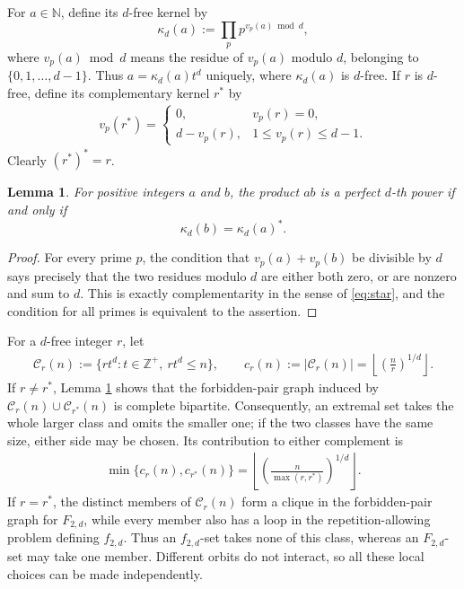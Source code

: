 \documentclass[10pt,a4paper]{amsart}
\numberwithin{equation}{section}
\newcommand{\cC}{\mathcal C}
\newcommand{\1}{\mathbf 1}
\newtheorem{lemma}[theorem]{Lemma}
\begin{document}
For $a\in\mathbb{N}$, define its $d$-free kernel by
\[
 \kappa_d(a):=\prod_p p^{v_p(a)\bmod d},
\]
where $v_p(a)\bmod d$ means the residue of $v_p(a)$ modulo $d$, belonging to $\{0,1,\ldots,d-1\}$.
Thus $a=\kappa_d(a)t^d$ uniquely, where $\kappa_d(a)$ is $d$-free.
If $r$ is $d$-free, define its complementary kernel $r^*$ by
\begin{align}
 v_p(r^*)=
 \begin{cases}
 0,&v_p(r)=0,\\
 d-v_p(r),&1\leq v_p(r)\leq d-1.
 \end{cases}
\label{eq:star}
\end{align}
Clearly $(r^*)^*=r$.

\begin{lemma}\label{lem:kernelcriterion}
For positive integers $a$ and $b$, the product $ab$ is a perfect
$d$-th power if and only if
\[
 \kappa_d(b)=\kappa_d(a)^*.
\]
\end{lemma}

\begin{proof}
For every prime $p$, the condition that $v_p(a)+v_p(b)$ be divisible
by $d$ says precisely that the two residues modulo $d$ are either both
zero, or are nonzero and sum to $d$.  This is exactly complementarity
in the sense of \eqref{eq:star}, and the condition for all primes is
equivalent to the assertion.
\end{proof}

For a $d$-free integer $r$, let
\begin{align}
 \cC_r(n):=\{rt^d:t\in\mathbb{Z}^{+},\ rt^d\leq n\},
 \qquad
 c_r(n):=|\cC_r(n)|
 =\left\lfloor\left(\frac nr\right)^{1/d}\right\rfloor.\label{eq:classes}
\end{align}
If $r\neq r^*$, Lemma \ref{lem:kernelcriterion} shows that the
forbidden-pair graph induced by
$\cC_r(n)\cup\cC_{r^*}(n)$ is complete bipartite.  Consequently, an
extremal set takes the whole larger class and omits the smaller one;
if the two classes have the same size, either side may be chosen.
Its contribution to either complement is
\begin{align*}
 \min\{c_r(n),c_{r^*}(n)\}
 =\left\lfloor
 \left(\frac{n}{\max(r,r^*)}\right)^{1/d}
 \right\rfloor.
\end{align*}
If $r=r^*$, the distinct members of $\cC_r(n)$ form a clique in the
forbidden-pair graph for $F_{2,d}$, while every member also has a loop
in the repetition-allowing problem defining $f_{2,d}$.  Thus an
$f_{2,d}$-set takes none of this class, whereas an $F_{2,d}$-set may
take one member.  Different orbits do not interact, so all these local
choices can be made independently.
\end{document}
